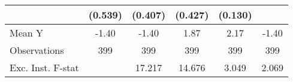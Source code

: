 {\begin{tabular}{l*{5}{c}}
            &     (0.539)         &     (0.407)         &     (0.427)         &     (0.130)         &                     \\
\midrule
Mean Y      &       -1.40         &       -1.40         &        1.87         &        2.17         &       -1.40         \\
Observations&         399         &         399         &         399         &         399         &         399         \\
Exc. Inst. F-stat&                     &      17.217         &      14.676         &       3.049         &       2.069         \\
\bottomrule
\end{tabular}
}

